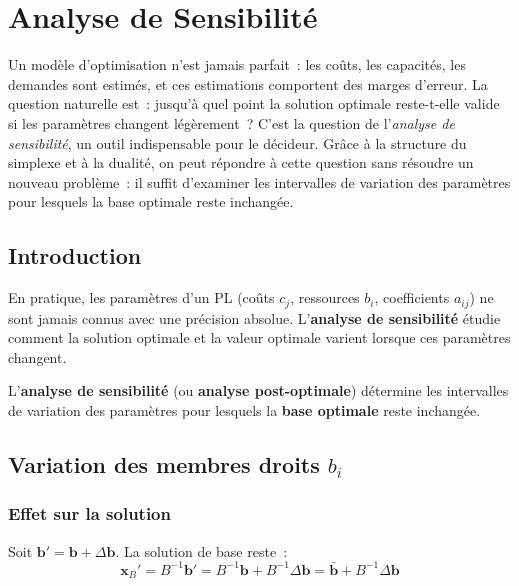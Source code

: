 \chapter{Analyse de Sensibilit\'e}
\label{ch:sensibilite}

Un mod\`ele d'optimisation n'est jamais parfait~: les co\^uts, les capacit\'es, les demandes sont estim\'es, et ces estimations comportent des marges d'erreur. La question naturelle est~: jusqu'\`a quel point la solution optimale reste-t-elle valide si les param\`etres changent l\'eg\`erement~? C'est la question de l'\emph{analyse de sensibilit\'e}, un outil indispensable pour le d\'ecideur. Gr\^ace \`a la structure du simplexe et \`a la dualit\'e, on peut r\'epondre \`a cette question sans r\'esoudre un nouveau probl\`eme~: il suffit d'examiner les intervalles de variation des param\`etres pour lesquels la base optimale reste inchang\'ee.

\section{Introduction}

En pratique, les param\`etres d'un PL (co\^uts $c_j$, ressources $b_i$,
coefficients $a_{ij}$) ne sont jamais connus avec une pr\'ecision absolue.
L'\textbf{analyse de sensibilit\'e} \'etudie comment la solution optimale
et la valeur optimale varient lorsque ces param\`etres changent.

\begin{definition}
L'\textbf{analyse de sensibilit\'e} (ou \textbf{analyse post-optimale})
d\'etermine les intervalles de variation des param\`etres pour lesquels
la \textbf{base optimale} reste inchang\'ee.
\end{definition}

\section{Variation des membres droits $b_i$}

\subsection{Effet sur la solution}

Soit $\mathbf{b}' = \mathbf{b} + \Delta\mathbf{b}$.  La solution de base
reste~:
\[
  \mathbf{x}_B' = B^{-1}\mathbf{b}' = B^{-1}\mathbf{b} + B^{-1}\Delta\mathbf{b}
  = \bar{\mathbf{b}} + B^{-1}\Delta\mathbf{b}
\]

